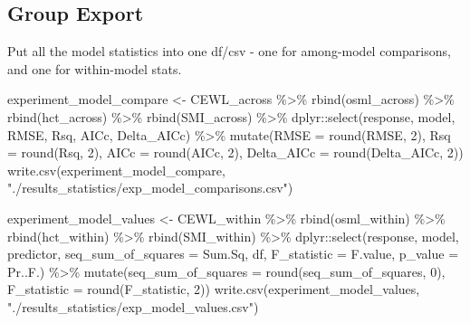 \documentclass[
]{article}
\newenvironment{Shaded}{\begin{snugshade}}{\end{snugshade}}
\newcommand{\AttributeTok}[1]{\textcolor[rgb]{0.77,0.63,0.00}{#1}}
\newcommand{\DecValTok}[1]{\textcolor[rgb]{0.00,0.00,0.81}{#1}}
\newcommand{\FunctionTok}[1]{\textcolor[rgb]{0.00,0.00,0.00}{#1}}
\newcommand{\NormalTok}[1]{#1}
\newcommand{\OtherTok}[1]{\textcolor[rgb]{0.56,0.35,0.01}{#1}}
\newcommand{\SpecialCharTok}[1]{\textcolor[rgb]{0.00,0.00,0.00}{#1}}
\newcommand{\StringTok}[1]{\textcolor[rgb]{0.31,0.60,0.02}{#1}}
\begin{document}
\hypertarget{group-export}{%
\subsection{Group Export}\label{group-export}}

Put all the model statistics into one df/csv - one for among-model
comparisons, and one for within-model stats.

\begin{Shaded}
\begin{Highlighting}[]
\NormalTok{experiment\_model\_compare }\OtherTok{\textless{}{-}}\NormalTok{ CEWL\_across }\SpecialCharTok{\%\textgreater{}\%}
  \FunctionTok{rbind}\NormalTok{(osml\_across) }\SpecialCharTok{\%\textgreater{}\%}
  \FunctionTok{rbind}\NormalTok{(hct\_across) }\SpecialCharTok{\%\textgreater{}\%}
  \FunctionTok{rbind}\NormalTok{(SMI\_across) }\SpecialCharTok{\%\textgreater{}\%}
\NormalTok{  dplyr}\SpecialCharTok{::}\FunctionTok{select}\NormalTok{(response, model, }
\NormalTok{                RMSE, Rsq, AICc, Delta\_AICc) }\SpecialCharTok{\%\textgreater{}\%}
  \FunctionTok{mutate}\NormalTok{(}\AttributeTok{RMSE =} \FunctionTok{round}\NormalTok{(RMSE, }\DecValTok{2}\NormalTok{), }
         \AttributeTok{Rsq =} \FunctionTok{round}\NormalTok{(Rsq, }\DecValTok{2}\NormalTok{), }
         \AttributeTok{AICc =} \FunctionTok{round}\NormalTok{(AICc, }\DecValTok{2}\NormalTok{), }
         \AttributeTok{Delta\_AICc =} \FunctionTok{round}\NormalTok{(Delta\_AICc, }\DecValTok{2}\NormalTok{)) }
\FunctionTok{write.csv}\NormalTok{(experiment\_model\_compare, }
          \StringTok{"./results\_statistics/exp\_model\_comparisons.csv"}\NormalTok{)}

\NormalTok{experiment\_model\_values }\OtherTok{\textless{}{-}}\NormalTok{ CEWL\_within }\SpecialCharTok{\%\textgreater{}\%}
  \FunctionTok{rbind}\NormalTok{(osml\_within) }\SpecialCharTok{\%\textgreater{}\%}
  \FunctionTok{rbind}\NormalTok{(hct\_within) }\SpecialCharTok{\%\textgreater{}\%}
  \FunctionTok{rbind}\NormalTok{(SMI\_within) }\SpecialCharTok{\%\textgreater{}\%}
\NormalTok{  dplyr}\SpecialCharTok{::}\FunctionTok{select}\NormalTok{(response, model, predictor, }
                \AttributeTok{seq\_sum\_of\_squares =}\NormalTok{ Sum.Sq, }
\NormalTok{                df, }
                \AttributeTok{F\_statistic =}\NormalTok{ F.value, }
                \AttributeTok{p\_value =}\NormalTok{ Pr..F.) }\SpecialCharTok{\%\textgreater{}\%}
  \FunctionTok{mutate}\NormalTok{(}\AttributeTok{seq\_sum\_of\_squares =} \FunctionTok{round}\NormalTok{(seq\_sum\_of\_squares, }\DecValTok{0}\NormalTok{), }
         \AttributeTok{F\_statistic =} \FunctionTok{round}\NormalTok{(F\_statistic, }\DecValTok{2}\NormalTok{)) }
\FunctionTok{write.csv}\NormalTok{(experiment\_model\_values, }\StringTok{"./results\_statistics/exp\_model\_values.csv"}\NormalTok{)}
\end{Highlighting}
\end{Shaded}
\end{document}

